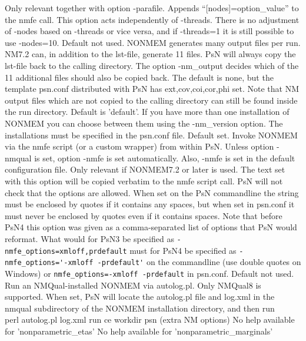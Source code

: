 \begin{optionlist}
\nextopt
{}
Only relevant together with option -parafile. Appends “[nodes]=option\_value” to the nmfe call. This option acts independently of -threads. There is no adjustment of -nodes based on -threads or vice versa, and if -threads=1 it is still possible to use -nodes=10. 
\nextopt
{}
Default not used.  NONMEM generates many output files per run. NM7.2 can, in addition to the lst-file, generate 11 files. PsN will always copy the lst-file back to the calling directory. The option -nm\_output decides which of the 11 additional files should also be copied back. The default is none, but the template psn.conf distributed with PsN has ext,cov,coi,cor,phi set. Note that NM output files which are not copied to the calling directory can still be found inside the run directory. 
\nextopt
{}
Default is 'default'. If you have more than one installation of NONMEM you can choose between them using the -nm\_version option. The installations must be specified in the psn.conf file. 
\nextopt
{}
Default set.
Invoke NONMEM via the nmfe script (or a custom wrapper) from within PsN. 
Unless option -nmqual is set, option -nmfe is 
set automatically. Also, -nmfe is set in the default configuration file.
\nextopt
{}
Only relevant if NONMEM7.2 or later is used. 
The text set with this option will be copied verbatim to the nmfe script call. PsN will not check that the options are allowed. When set on the PsN commandline the string must be enclosed by quotes if it contains any spaces, but when set in psn.conf it must never be enclosed by quotes even if it contains spaces. 
Note that before PsN4 this option was given as a comma-separated list of options that PsN would reformat. What would for PsN3 be specified as 
\verb|-nmfe_options=xmloff,prdefault| must for PsN4 be specified as \verb|-nmfe_options='-xmloff -prdefault'| on the commandline (use double quotes on Windows) or 
\verb|nmfe_options=-xmloff -prdefault| in psn.conf.
\nextopt
{}
Default not used. Run an NMQual-installed NONMEM via autolog.pl. Only NMQual8 is supported. 
When set, PsN will locate the autolog.pl file and log.xml in the nmqual subdirectory of the NONMEM installation directory, and then run \\
perl autolog.pl log.xml run ce workdir psn (extra NM options)
\nextopt
{}
No help available for 'nonparametric\_etas' 
\nextopt
{}
No help available for 'nonparametric\_marginals' 

\end{optionlist}
